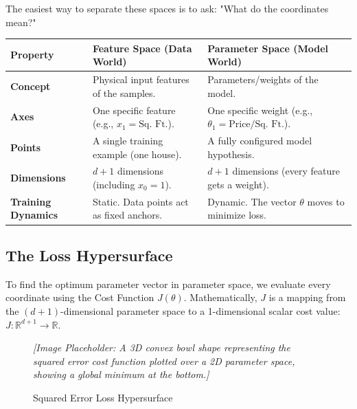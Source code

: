 \documentclass[12pt, a4paper]{report}
\begin{document}
The easiest way to separate these spaces is to ask: "What do the coordinates mean?"

\begin{table}[H]
\centering
\renewcommand{\arraystretch}{1.5}
\begin{tabular}{p{2.5cm} p{6cm} p{6cm}}
\toprule
\textbf{Property} & \textbf{Feature Space (Data World)} & \textbf{Parameter Space (Model World)} \\
\midrule
\textbf{Concept} & Physical input features of the samples. & Parameters/weights of the model. \\
\textbf{Axes} & One specific feature (e.g., $x_1 = \text{Sq. Ft.}$). & One specific weight (e.g., $\theta_1 = \text{Price/Sq. Ft.}$). \\
\textbf{Points} & A single training example (one house). & A fully configured model hypothesis. \\
\textbf{Dimensions} & $d+1$ dimensions (including $x_0=1$). & $d+1$ dimensions (every feature gets a weight). \\
\textbf{Training} \newline \textbf{Dynamics} & Static. Data points act as fixed anchors. & Dynamic. The vector $\theta$ moves to minimize loss. \\
\bottomrule
\end{tabular}
\end{table}

\subsection{The Loss Hypersurface}

To find the optimum parameter vector in parameter space, we evaluate every coordinate using the Cost Function $J(\theta)$. Mathematically, $J$ is a mapping from the $(d+1)$-dimensional parameter space to a 1-dimensional scalar cost value: $J: \mathbb{R}^{d+1} \to \mathbb{R}$.

\begin{figure}[H]
    \centering
    \begin{tcolorbox}[colback=gray!10, colframe=gray!50, width=0.8\textwidth, center]
        \centering
        \textit{[Image Placeholder: A 3D convex bowl shape representing the squared error cost function plotted over a 2D parameter space, showing a global minimum at the bottom.]}
    \end{tcolorbox}
    \caption{Squared Error Loss Hypersurface}
\end{figure}
\end{document}
